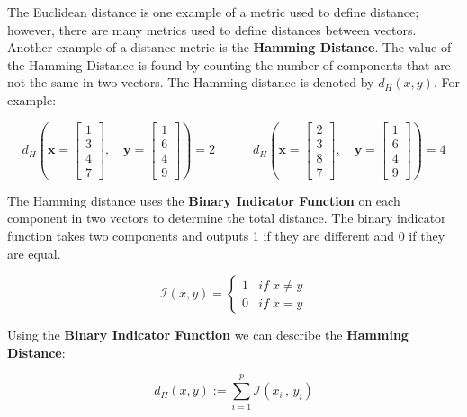 The Euclidean distance is one example of a metric used to define distance; however, there are many metrics used to define distances between vectors. \\

Another example of a distance metric is the \textbf{Hamming Distance}. The value of the Hamming Distance is found by counting the number of components that are not the same in two vectors. The Hamming distance is denoted by $d_H (x,y)$. For example:

\[
d_H \left( \mathbf{x} = 
\begin{bmatrix}
    1 \\
    3 \\
    4 \\
    7
\end{bmatrix}, 
\quad
\mathbf{y} = 
\begin{bmatrix}
    1 \\
    6 \\
    4 \\
    9
\end{bmatrix} \right) = 2
\quad \quad \quad 
d_H \left( \mathbf{x} = 
\begin{bmatrix}
    2 \\
    3 \\
    8 \\
    7
\end{bmatrix},
\quad
\mathbf{y} = 
\begin{bmatrix}
    1 \\
    6 \\
    4 \\
    9
\end{bmatrix} \right) = 4
\]

The Hamming distance uses the \textbf{Binary Indicator Function} on each component in two vectors to determine the total distance. The binary indicator function takes two components and outputs 1 if they are different and 0 if they are equal.

\[
\mathcal{I}(x,y) = 
\begin{cases}
    1 & if \; x \neq y\\
    0 & if \; x = y
\end{cases}
\]

Using the \textbf{Binary Indicator Function} we can describe the \textbf{Hamming Distance}:

\[
    d_H(x,y):= \sum^p_{i=1} \mathcal{I}(x_i \, , \, y_i)
\]


